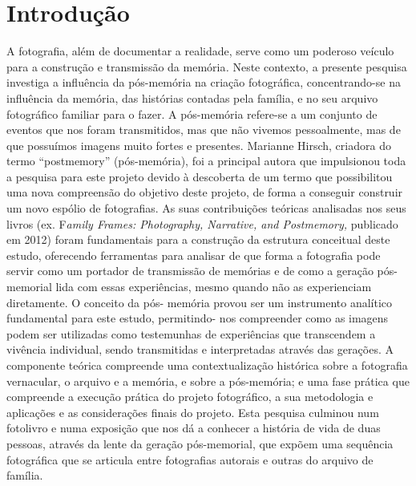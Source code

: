 \documentclass{article}
\begin{document}
\section{Introdução }
A fotografia, além de documentar a realidade, serve como um poderoso veículo 
para  a  construção  e  transmissão  da  memória\textit{.  }Neste  contexto,  a  presente  pesquisa 
investiga  a  influência  da  pós-memória  na  criação  fotográfica,  concentrando-se  na 
influência da memória, das histórias contadas pela família, e no seu arquivo fotográfico 
familiar para o fazer.  
A pós-memória refere-se a um conjunto de eventos que nos foram transmitidos, 
mas  que  não  vivemos  pessoalmente,  mas  de  que  possuímos  imagens  muito  fortes  e 
presentes.  Marianne  Hirsch,  criadora  do  termo  “postmemory”  (pós-memória),  foi  a 
principal autora que impulsionou toda a pesquisa para este projeto devido à descoberta de 
um termo que possibilitou uma nova compreensão do objetivo deste projeto, de forma a 
conseguir  construir  um  novo  espólio  de  fotografias.  As  suas  contribuições  teóricas 
analisadas nos seus livros (ex. F\textit{amily Frames: Photography, Narrative, and Postmemory, }
publicado em 2012) foram fundamentais para a construção da estrutura conceitual deste 
estudo, oferecendo ferramentas para analisar de que forma a fotografia pode servir como 
um portador de transmissão de memórias e de como a geração pós-memorial lida com 
essas experiências, mesmo quando não as experienciam diretamente. O conceito da pós-
memória provou ser um instrumento analítico fundamental para este estudo, permitindo-
nos  compreender  como  as  imagens  podem  ser  utilizadas  como  testemunhas  de 
experiências que transcendem a vivência individual, sendo transmitidas e interpretadas 
através das gerações. A componente teórica compreende uma contextualização histórica 
sobre a fotografia vernacular, o arquivo e a memória, e sobre a pós-memória; e uma fase 
prática que compreende a execução prática do projeto fotográfico, a sua metodologia e 
aplicações e as considerações finais do projeto. Esta pesquisa culminou num fotolivro e 
numa exposição que nos dá a conhecer a história de vida de duas pessoas, através da lente 
da geração pós-memorial, que expõem uma sequência fotográfica que se articula entre 
fotografias autorais e outras do arquivo de família.  
 
\end{document}
